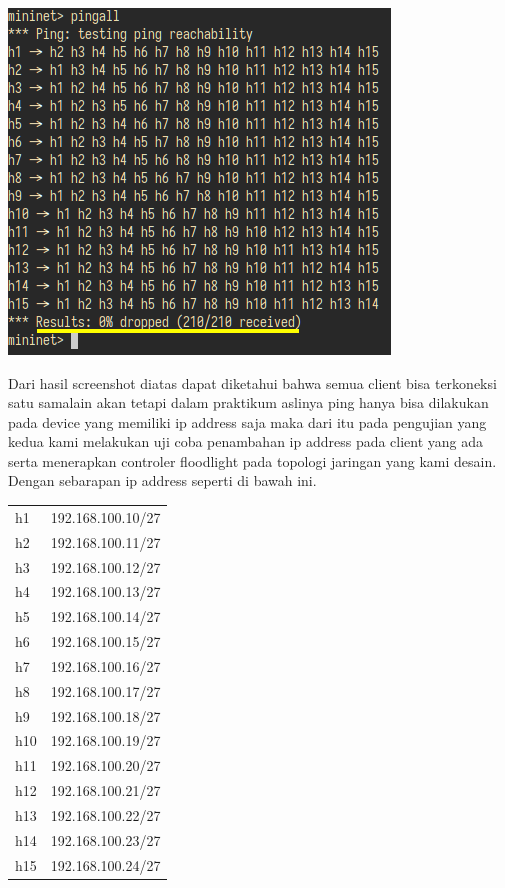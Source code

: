 \begin{center}
\includegraphics[width=3.989in,height=3.6138in]{gambar/pingall.png}
\end{center}

Dari hasil screenshot diatas dapat diketahui bahwa semua client bisa terkoneksi satu samalain akan tetapi dalam
praktikum aslinya ping hanya bisa dilakukan pada device yang memiliki ip address saja maka dari itu pada pengujian yang
kedua kami melakukan uji coba penambahan ip address pada client yang ada serta menerapkan controler floodlight pada
topologi jaringan yang kami desain. Dengan sebarapan ip address seperti di bawah ini.


\begin{center}
\tablefirsthead{}
\tablehead{}
\tabletail{}
\tablelasttail{}
\begin{supertabular}{|m{1.1087599in}|m{1.7934599in}|}
\hline
{} &
\centering{}\\\hline
\centering h1 &
192.168.100.10/27\\\hline
\centering h2 &
192.168.100.11/27\\\hline
\centering h3 &
192.168.100.12/27\\\hline
\centering h4 &
192.168.100.13/27\\\hline
\centering h5 &
192.168.100.14/27\\\hline
\centering h6 &
192.168.100.15/27\\\hline
\centering h7 &
192.168.100.16/27\\\hline
\centering h8 &
192.168.100.17/27\\\hline
\centering h9 &
192.168.100.18/27\\\hline
\centering h10 &
192.168.100.19/27\\\hline
\centering h11 &
192.168.100.20/27\\\hline
\centering h12 &
192.168.100.21/27\\\hline
\centering h13 &
192.168.100.22/27\\\hline
\centering h14 &
192.168.100.23/27\\\hline
\centering h15 &
192.168.100.24/27\\\hline
\end{supertabular}
\end{center}


